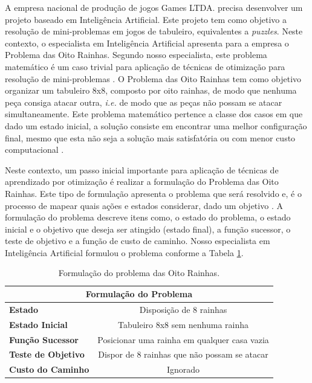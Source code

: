 
A empresa nacional de produção de jogos Games LTDA. precisa desenvolver um projeto baseado em Inteligência Artificial. Este projeto tem como objetivo a resolução de mini-problemas em jogos de tabuleiro, equivalentes a \textit{puzzles}. Neste contexto, o especialista em Inteligência Artificial apresenta para a empresa o Problema das Oito Rainhas. Segundo nosso especialista, este problema matemático é um caso trivial para aplicação de técnicas de otimização para resolução de mini-problemas \cite{erbas1992different}. O Problema das Oito Rainhas tem como objetivo organizar um tabuleiro 8x8, composto por oito rainhas, de modo que nenhuma peça consiga atacar outra, \textit{i.e.} de modo que as peças não possam se atacar simultaneamente. Este problema matemático pertence a classe dos casos em que dado um estado inicial, a solução consiste em encontrar uma melhor configuração final, mesmo que esta não seja a solução mais satisfatória ou com menor custo computacional \cite{rivin1994n}.


Neste contexto, um passo inicial importante para aplicação de técnicas de aprendizado por otimização é realizar a formulação do Problema das Oito Rainhas. Este tipo de formulação  apresenta o problema que será resolvido e, é o processo de mapear quais ações e estados considerar, dado um objetivo \cite{russell2002artificial}. A formulação do problema descreve itens como, o estado do problema, o estado inicial e o objetivo que deseja ser atingido (estado final), a função sucessor, o teste de objetivo e a função de custo de caminho. Nosso especialista em Inteligência Artificial formulou o problema conforme a Tabela \ref{tab:my-table}.

\begin{table}[h]
    \centering
    \caption{Formulação do problema das Oito Rainhas.}
    \begin{tabular}{|l|c|}
        \hline
        \multicolumn{2}{|c|}{\textbf{Formulação do Problema}}                              \\ \hline
        \textbf{Estado}            & Disposição de 8 rainhas                      \\ \hline
        \textbf{Estado Inicial}    & Tabuleiro 8x8 sem nenhuma rainha                 \\ \hline
        \textbf{Função Sucessor}   & Posicionar uma rainha em qualquer casa vazia \\ \hline
        \textbf{Teste de Objetivo} & Dispor de 8 rainhas que não possam se atacar \\ \hline
        \textbf{Custo do Caminho}  & Ignorado                                     \\ \hline
    \end{tabular}
    
    \label{tab:my-table}
\end{table}

